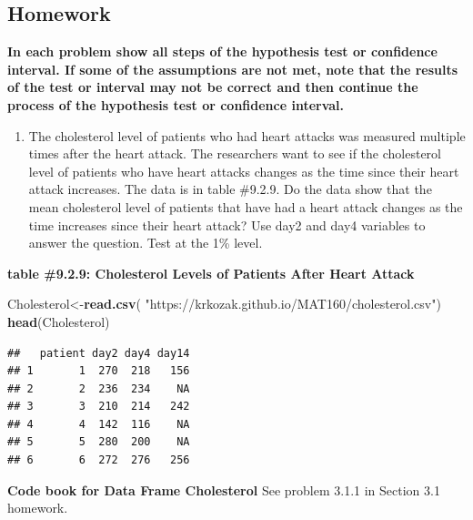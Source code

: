 \documentclass[
]{book}
\newenvironment{Shaded}{\begin{snugshade}}{\end{snugshade}}
\newcommand{\KeywordTok}[1]{\textcolor[rgb]{0.13,0.29,0.53}{\textbf{#1}}}
\newcommand{\NormalTok}[1]{#1}
\newcommand{\StringTok}[1]{\textcolor[rgb]{0.31,0.60,0.02}{#1}}
\providecommand{\tightlist}{%
  \setlength{\itemsep}{0pt}\setlength{\parskip}{0pt}}
\begin{document}
\hypertarget{homework-23}{%
\subsection{Homework}\label{homework-23}}

\textbf{In each problem show all steps of the hypothesis test or confidence interval. If some of the assumptions are not met, note that the results of the test or interval may not be correct and then continue the process of the hypothesis test or confidence interval.}

\begin{enumerate}
\def\labelenumi{\arabic{enumi}.}
\tightlist
\item
  The cholesterol level of patients who had heart attacks was measured multiple times after the heart attack. The researchers want to see if the cholesterol level of patients who have heart attacks changes as the time since their heart attack increases. The data is in table \#9.2.9. Do the data show that the mean cholesterol level of patients that have had a heart attack changes as the time increases since their heart attack? Use day2 and day4 variables to answer the question. Test at the 1\% level.
\end{enumerate}

\textbf{table \#9.2.9: Cholesterol Levels of Patients After Heart Attack}

\begin{Shaded}
\begin{Highlighting}[]
\NormalTok{Cholesterol<-}\KeywordTok{read.csv}\NormalTok{(}
  \StringTok{"https://krkozak.github.io/MAT160/cholesterol.csv"}\NormalTok{)}
\KeywordTok{head}\NormalTok{(Cholesterol)}
\end{Highlighting}
\end{Shaded}

\begin{verbatim}
##   patient day2 day4 day14
## 1       1  270  218   156
## 2       2  236  234    NA
## 3       3  210  214   242
## 4       4  142  116    NA
## 5       5  280  200    NA
## 6       6  272  276   256
\end{verbatim}

\textbf{Code book for Data Frame Cholesterol} See problem 3.1.1 in Section 3.1 homework.
\end{document}
